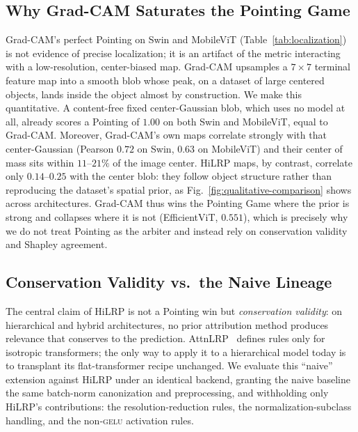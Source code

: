 \documentclass[lettersize,journal]{IEEEtran}
\begin{document}
\subsection{Why Grad-CAM Saturates the Pointing Game}
\label{sec:gradcam-blob}
Grad-CAM's perfect Pointing on Swin and MobileViT (Table~\ref{tab:localization}) is not evidence of precise localization; it is an artifact of the metric interacting with a low-resolution, center-biased map. Grad-CAM upsamples a $7{\times}7$ terminal feature map into a smooth blob whose peak, on a dataset of large centered objects, lands inside the object almost by construction. We make this quantitative. A content-free fixed center-Gaussian blob, which uses no model at all, already scores a Pointing of $1.00$ on both Swin and MobileViT, equal to Grad-CAM. Moreover, Grad-CAM's own maps correlate strongly with that center-Gaussian (Pearson $0.72$ on Swin, $0.63$ on MobileViT) and their center of mass sits within $11$--$21\%$ of the image center. HiLRP maps, by contrast, correlate only $0.14$--$0.25$ with the center blob: they follow object structure rather than reproducing the dataset's spatial prior, as Fig.~\ref{fig:qualitative-comparison} shows across architectures. Grad-CAM thus wins the Pointing Game where the prior is strong and collapses where it is not (EfficientViT, $0.551$), which is precisely why we do not treat Pointing as the arbiter and instead rely on conservation validity and Shapley agreement.

\subsection{Conservation Validity vs.\ the Naive Lineage}
\label{sec:conservation-validity}
The central claim of HiLRP is not a Pointing win but \emph{conservation validity}: on hierarchical and hybrid architectures, no prior attribution method produces relevance that conserves to the prediction. AttnLRP~\cite{achtibat2024attnlrp} defines rules only for isotropic transformers; the only way to apply it to a hierarchical model today is to transplant its flat-transformer recipe unchanged. We evaluate this ``naive'' extension against HiLRP under an identical backend, granting the naive baseline the same batch-norm canonization and preprocessing, and withholding only HiLRP's contributions: the resolution-reduction rules, the normalization-subclass handling, and the non-\textsc{gelu} activation rules.
\end{document}
